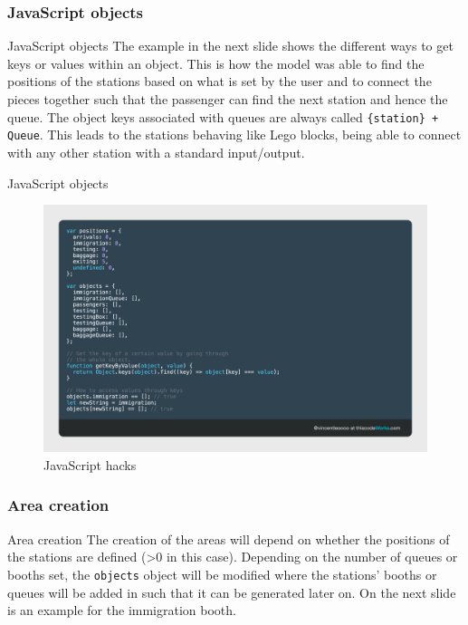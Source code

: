 \documentclass{beamer}
\begin{document}
\subsubsection*{JavaScript objects}
\begin{frame}{JavaScript objects}
	The example in the next slide shows the different ways to get keys or values within an object. This is how the model was able to find the positions of the stations based on what is set by the user and to connect the pieces together such that the passenger can find the next station and hence the queue. The object keys associated with queues are always called \texttt{\{station\} + Queue}. This leads to the stations behaving like Lego blocks, being able to connect with any other station with a standard input/output.
\end{frame}

\begin{frame}{JavaScript objects}
	\begin{figure}
		\includegraphics[width=\linewidth]{../img/objects-and-extraction-of-key-value-pairs}\caption{JavaScript hacks}
	\end{figure}
\end{frame}

\subsubsection*{Area creation}
\begin{frame}{Area creation}
	The creation of the areas will depend on whether the positions of the stations are defined (>0 in this case). Depending on the number of queues or booths set, the \texttt{objects} object will be modified where the stations' booths or queues will be added in such that it can be generated later on. On the next slide is an example for the immigration booth.
\end{frame}
\end{document}
